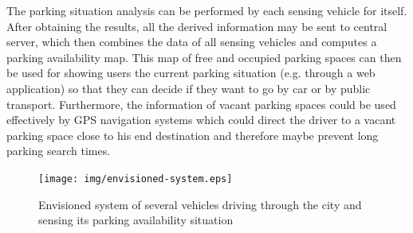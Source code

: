 The parking situation analysis can be performed by each sensing vehicle for itself. After obtaining the results, all the derived information may be sent to central server, which then combines the data of all sensing vehicles and computes a parking availability map. This map of free and occupied parking spaces can then be used for showing users the current parking situation (e.g. through a web application) so that they can decide if they want to go by car or by public transport. Furthermore, the information of vacant parking spaces could be used effectively by GPS navigation systems which could direct the driver to a vacant parking space close to his end destination and therefore maybe prevent long parking search times.


\begin{figure}
	\centering
	\texttt{[image: img/envisioned-system.eps]}
	\caption{Envisioned system of several vehicles driving through the city and sensing its parking availability situation}
	\label{fig:envisioned_system}
\end{figure}

